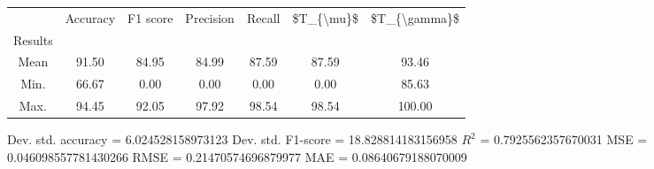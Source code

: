 \begin{tabular}{|c|c|c|c|c|c|c|}
\toprule
{} &  Accuracy &  F1 score &  Precision &  Recall &  \$T\_\{\textbackslash mu\}\$ &  \$T\_\{\textbackslash gamma\}\$ \\
Results &           &           &            &         &            &               \\
\hline
Mean    &     91.50 &     84.95 &      84.99 &   87.59 &      87.59 &         93.46 \\
Min.    &     66.67 &      0.00 &       0.00 &    0.00 &       0.00 &         85.63 \\
Max.    &     94.45 &     92.05 &      97.92 &   98.54 &      98.54 &        100.00 \\
\bottomrule
\end{tabular}

 Dev. std. accuracy = 6.024528158973123
 Dev. std. F1-score = 18.828814183156958
 $R^2$ = 0.7925562357670031
 MSE = 0.046098557781430266
 RMSE = 0.21470574696879977
 MAE = 0.08640679188070009